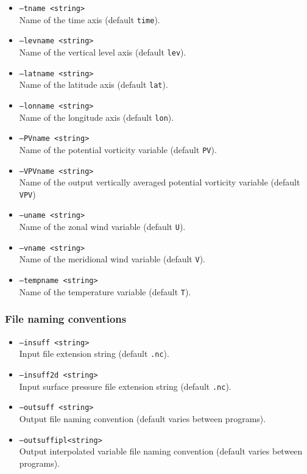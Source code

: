 \documentclass{article}
\begin{document}
\begin{itemize}
\item[] \texttt{--tname <string>}\\Name of the time axis (default \texttt{time}).
\item[] \texttt{--levname <string>}\\Name of the vertical level axis (default \texttt{lev}).
\item[]\texttt{--latname <string>}\\Name of the latitude axis (default \texttt{lat}).
\item[]\texttt{--lonname <string>}\\Name of the longitude axis (default \texttt{lon}).
\item[] \texttt{--PVname <string>}\\Name of the potential vorticity variable (default \texttt{PV}).
\item[]\texttt{--VPVname <string>}\\Name of the output vertically averaged potential vorticity variable (default \texttt{VPV})
\item[] \texttt{--uname <string>}\\Name of the zonal wind variable (default \texttt{U}).
\item[] \texttt{--vname <string>}\\Name of the meridional wind variable (default \texttt{V}).
\item[] \texttt{--tempname <string>}\\Name of the temperature variable (default \texttt{T}).
\end{itemize}

\subsubsection{File naming conventions}
\begin{itemize}
\item[]\texttt{--insuff <string>}\\Input file extension string (default \texttt{.nc}).
\item[]\texttt{--insuff2d <string>}\\Input surface pressure file extension string (default \texttt{.nc}).
\item[]\texttt{--outsuff <string>}\\Output file naming convention (default varies between programs).
\item[] \texttt{--outsuffipl<string>}\\Output interpolated variable file naming convention (default varies between programs).
\end{itemize}
\end{document}
